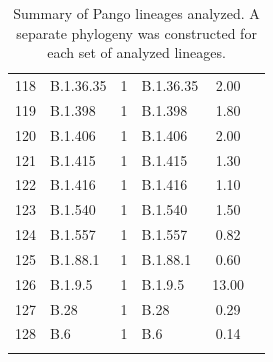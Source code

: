 \documentclass[9pt,twoside,lineno]{pnas-new}
\begin{document}
\begin{longtable}{llcp{4cm}cc}
  118 & B.1.36.35 &   1 & B.1.36.35 & 2.00 \\ 
  119 & B.1.398 &   1 & B.1.398 & 1.80 \\ 
  120 & B.1.406 &   1 & B.1.406 & 2.00 \\ 
  121 & B.1.415 &   1 & B.1.415 & 1.30 \\ 
  122 & B.1.416 &   1 & B.1.416 & 1.10 \\ 
  123 & B.1.540 &   1 & B.1.540 & 1.50 \\ 
  124 & B.1.557 &   1 & B.1.557 & 0.82 \\ 
  125 & B.1.88.1 &   1 & B.1.88.1 & 0.60 \\ 
  126 & B.1.9.5 &   1 & B.1.9.5 & 13.00 \\ 
  127 & B.28 &   1 & B.28 & 0.29 \\ 
  128 & B.6 &   1 & B.6 & 0.14 \\ 
   \hline
\hline
\caption{Summary of Pango lineages analyzed. A separate phylogeny was constructed for each set of analyzed lineages.} 
\label{tab:lineage-data-summary}
\end{longtable}










% 
\end{document}
